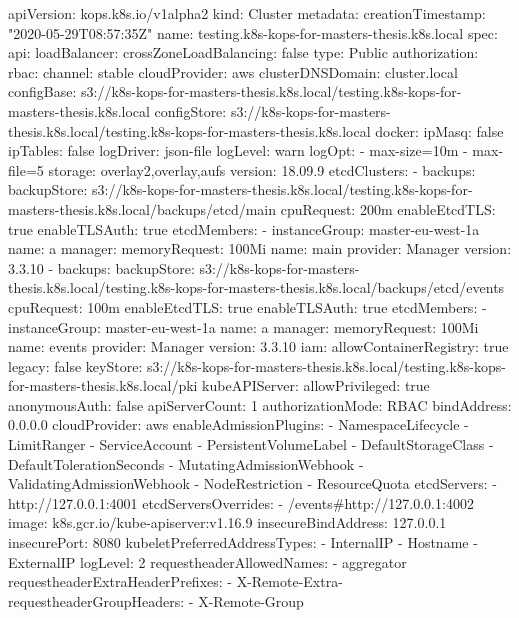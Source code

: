 apiVersion: kops.k8s.io/v1alpha2
kind: Cluster
metadata:
  creationTimestamp: "2020-05-29T08:57:35Z"
  name: testing.k8s-kops-for-masters-thesis.k8s.local
spec:
  api:
    loadBalancer:
      crossZoneLoadBalancing: false
      type: Public
  authorization:
    rbac: {}
  channel: stable
  cloudProvider: aws
  clusterDNSDomain: cluster.local
  configBase: s3://k8s-kops-for-masters-thesis.k8s.local/testing.k8s-kops-for-masters-thesis.k8s.local
  configStore: s3://k8s-kops-for-masters-thesis.k8s.local/testing.k8s-kops-for-masters-thesis.k8s.local
  docker:
    ipMasq: false
    ipTables: false
    logDriver: json-file
    logLevel: warn
    logOpt:
    - max-size=10m
    - max-file=5
    storage: overlay2,overlay,aufs
    version: 18.09.9
  etcdClusters:
  - backups:
      backupStore: s3://k8s-kops-for-masters-thesis.k8s.local/testing.k8s-kops-for-masters-thesis.k8s.local/backups/etcd/main
    cpuRequest: 200m
    enableEtcdTLS: true
    enableTLSAuth: true
    etcdMembers:
    - instanceGroup: master-eu-west-1a
      name: a
    manager: {}
    memoryRequest: 100Mi
    name: main
    provider: Manager
    version: 3.3.10
  - backups:
      backupStore: s3://k8s-kops-for-masters-thesis.k8s.local/testing.k8s-kops-for-masters-thesis.k8s.local/backups/etcd/events
    cpuRequest: 100m
    enableEtcdTLS: true
    enableTLSAuth: true
    etcdMembers:
    - instanceGroup: master-eu-west-1a
      name: a
    manager: {}
    memoryRequest: 100Mi
    name: events
    provider: Manager
    version: 3.3.10
  iam:
    allowContainerRegistry: true
    legacy: false
  keyStore: s3://k8s-kops-for-masters-thesis.k8s.local/testing.k8s-kops-for-masters-thesis.k8s.local/pki
  kubeAPIServer:
    allowPrivileged: true
    anonymousAuth: false
    apiServerCount: 1
    authorizationMode: RBAC
    bindAddress: 0.0.0.0
    cloudProvider: aws
    enableAdmissionPlugins:
    - NamespaceLifecycle
    - LimitRanger
    - ServiceAccount
    - PersistentVolumeLabel
    - DefaultStorageClass
    - DefaultTolerationSeconds
    - MutatingAdmissionWebhook
    - ValidatingAdmissionWebhook
    - NodeRestriction
    - ResourceQuota
    etcdServers:
    - http://127.0.0.1:4001
    etcdServersOverrides:
    - /events#http://127.0.0.1:4002
    image: k8s.gcr.io/kube-apiserver:v1.16.9
    insecureBindAddress: 127.0.0.1
    insecurePort: 8080
    kubeletPreferredAddressTypes:
    - InternalIP
    - Hostname
    - ExternalIP
    logLevel: 2
    requestheaderAllowedNames:
    - aggregator
    requestheaderExtraHeaderPrefixes:
    - X-Remote-Extra-
    requestheaderGroupHeaders:
    - X-Remote-Group
